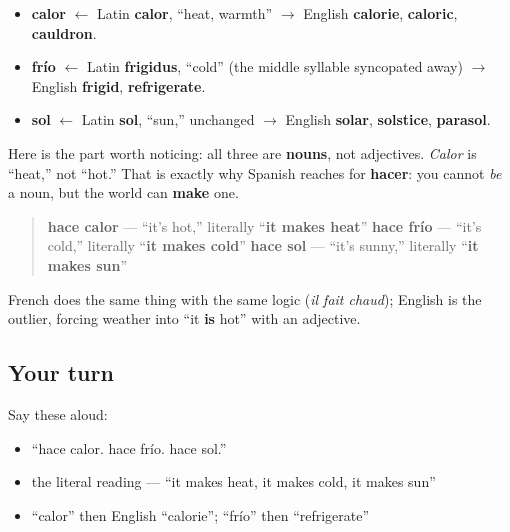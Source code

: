 \begin{cousinweb}
\begin{itemize}
\raggedright
  \item \textbf{calor} $\leftarrow$ Latin \textbf{calor}, \textquotedblleft{}heat, warmth\textquotedblright{} $\to$ English \textbf{calorie}, \textbf{caloric}, \textbf{cauldron}.
  \item \textbf{frío} $\leftarrow$ Latin \textbf{frigidus}, \textquotedblleft{}cold\textquotedblright{} (the middle syllable syncopated away) $\to$ English \textbf{frigid}, \textbf{refrigerate}.
  \item \textbf{sol} $\leftarrow$ Latin \textbf{sol}, \textquotedblleft{}sun,\textquotedblright{} unchanged $\to$ English \textbf{solar}, \textbf{solstice}, \textbf{parasol}.
\end{itemize}

Here is the part worth noticing: all three are \textbf{nouns}, not adjectives. \emph{Calor} is \textquotedblleft{}heat,\textquotedblright{} not \textquotedblleft{}hot.\textquotedblright{} That is exactly why Spanish reaches for \textbf{hacer}: you cannot \emph{be} a noun, but the world can \textbf{make} one.

\begin{quote}
\textbf{hace calor} — \textquotedblleft{}it's hot,\textquotedblright{} literally \textquotedblleft{}\textbf{it makes heat}\textquotedblright{} \textbf{hace frío} — \textquotedblleft{}it's cold,\textquotedblright{} literally \textquotedblleft{}\textbf{it makes cold}\textquotedblright{} \textbf{hace sol} — \textquotedblleft{}it's sunny,\textquotedblright{} literally \textquotedblleft{}\textbf{it makes sun}\textquotedblright{}
\end{quote}

French does the same thing with the same logic (\emph{il fait chaud}); English is the outlier, forcing weather into \textquotedblleft{}it \textbf{is} hot\textquotedblright{} with an adjective.
\end{cousinweb}

\subsection*{Your turn}
Say these aloud:

\begin{itemize}
\raggedright
  \item \textquotedblleft{}hace calor. hace frío. hace sol.\textquotedblright{}
  \item the literal reading — \textquotedblleft{}it makes heat, it makes cold, it makes sun\textquotedblright{}
  \item \textquotedblleft{}calor\textquotedblright{} then English \textquotedblleft{}calorie\textquotedblright{}; \textquotedblleft{}frío\textquotedblright{} then \textquotedblleft{}refrigerate\textquotedblright{}
\end{itemize}

